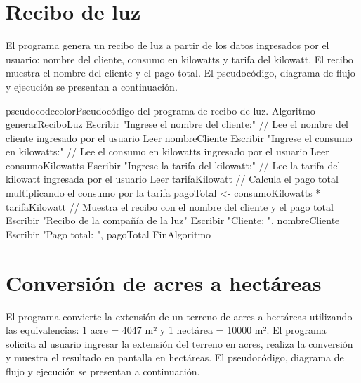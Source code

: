 
\section{Recibo de luz}

El programa genera un recibo de luz a partir de los datos ingresados por el usuario: nombre del cliente, consumo en kilowatts y tarifa del kilowatt. El recibo muestra el nombre del cliente y el pago total. El pseudocódigo, diagrama de flujo y ejecución se presentan a continuación.

\begin{sourcecode}{pseudocodecolor}{Pseudocódigo del programa de recibo de luz.}
Algoritmo generarReciboLuz
    Escribir "Ingrese el nombre del cliente:"
    // Lee el nombre del cliente ingresado por el usuario
    Leer nombreCliente
    Escribir "Ingrese el consumo en kilowatts:"
    // Lee el consumo en kilowatts ingresado por el usuario
    Leer consumoKilowatts
    Escribir "Ingrese la tarifa del kilowatt:"
    // Lee la tarifa del kilowatt ingresada por el usuario
    Leer tarifaKilowatt
    // Calcula el pago total multiplicando el consumo por la tarifa
    pagoTotal <- consumoKilowatts * tarifaKilowatt
    // Muestra el recibo con el nombre del cliente y el pago total
    Escribir "Recibo de la compañía de la luz"
    Escribir "Cliente: ", nombreCliente
    Escribir "Pago total: ", pagoTotal
FinAlgoritmo
\end{sourcecode}



\section{Conversión de acres a hectáreas}

El programa convierte la extensión de un terreno de acres a hectáreas utilizando las equivalencias: 1 acre = 4047 m² y 1 hectárea = 10000 m². El programa solicita al usuario ingresar la extensión del terreno en acres, realiza la conversión y muestra el resultado en pantalla en hectáreas. El pseudocódigo, diagrama de flujo y ejecución se presentan a continuación.

